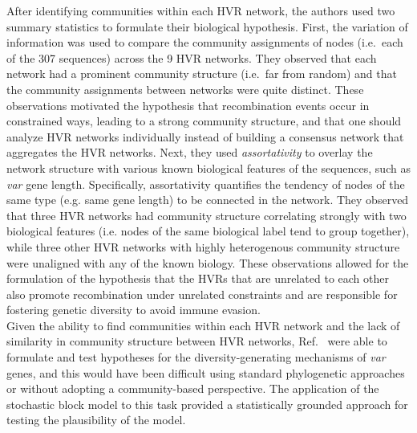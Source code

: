 \indent After identifying communities within each HVR network, the authors used two summary statistics to formulate their biological hypothesis. First, the variation of information \citep{VI} was used to compare the community assignments of nodes (i.e.\ each of the 307 sequences) across the 9 HVR networks. They observed that each network had a prominent community structure (i.e.\ far from random) and that the community assignments between networks were quite distinct. These observations motivated the hypothesis that recombination events occur in constrained ways, leading to a strong community structure, and that one should analyze HVR networks individually instead of building a consensus network that aggregates the HVR networks.  Next, they used \emph{assortativity} \cite{newmanAssort} to overlay the network structure with various known biological features of the sequences, such as  \emph{var} gene length. Specifically, assortativity quantifies the tendency of nodes of the same type (e.g. same gene length) to be connected in the network. They observed that three HVR networks had community structure correlating strongly with two biological features (i.e. nodes of the same biological label tend to group together), while three other HVR networks with highly heterogenous community structure were unaligned with any of the known biology. These observations allowed for the formulation of the hypothesis that the HVRs that are unrelated to each other also promote recombination under unrelated constraints and are responsible for fostering genetic diversity to avoid immune evasion. \\

\indent Given the ability to find communities within each HVR network and the lack of similarity in community structure between HVR networks, Ref.~\cite{larremoreparasite} were able to formulate and test hypotheses for the diversity-generating mechanisms of \emph{var} genes, and this would have been difficult using standard phylogenetic approaches or without adopting a community-based perspective. The application of the stochastic block model to this task provided a statistically grounded approach for testing the plausibility of the model.

